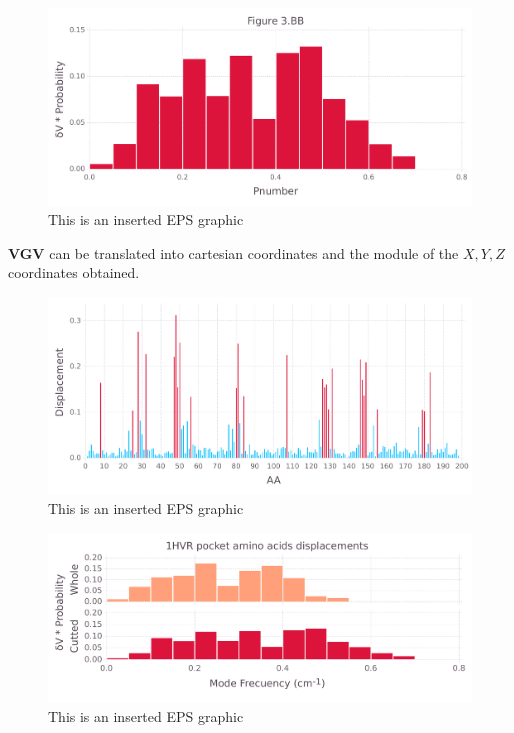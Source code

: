 \documentclass[10pt,letterpaper]{article}
\begin{document}
\begin{figure}[ht]
\begin{center}
\includegraphics[scale=0.5]{1hvr_apo/3bbfigure.pdf}
\caption{This is an inserted EPS graphic}
\label{fig11}
\end{center}
\end{figure}

\FloatBarrier


\textbf{VGV} can be translated into cartesian coordinates and the module of the \(X, Y, Z\) coordinates obtained.

\begin{figure}[ht]
\begin{center}
\includegraphics[scale=0.5]{1hvr_apo/5figure.pdf}
\caption{This is an inserted EPS graphic}
\label{fig13}
\end{center}
\end{figure}

\begin{figure}[ht]
\begin{center}
\includegraphics[scale=0.5]{1hvr_apo/3both_figure.pdf}
\caption{This is an inserted EPS graphic}
\label{fig13}
\end{center}
\end{figure}
\end{document}
